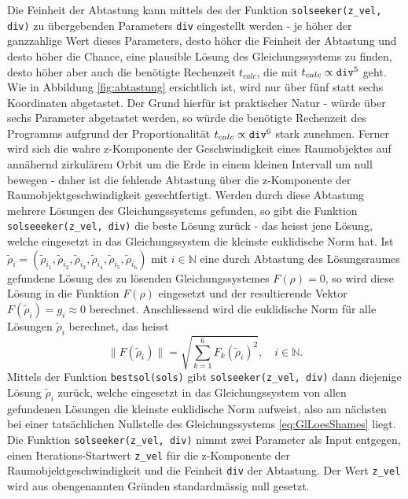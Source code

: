 \documentclass[a4paper,12pt]{article}
\numberwithin{equation}{section}
\begin{document}
Die Feinheit der Abtastung kann mittels des der Funktion \verb|solseeker(z_vel, div)| zu übergebenden Parameters \verb|div| eingestellt werden - je höher der ganzzahlige Wert dieses Parameters, desto höher die Feinheit der Abtastung und desto höher die Chance, eine plausible Lösung des Gleichungssystems zu finden, desto höher aber auch die benötigte Rechenzeit $t_{calc}$, die mit $t_{calc}\propto \verb|div|^5$ geht. Wie in Abbildung \ref{fig:abtastung} ersichtlich ist, wird nur über fünf statt sechs Koordinaten abgetastet. Der Grund hierfür ist praktischer Natur - würde über sechs Parameter abgetastet werden, so würde die benötigte Rechenzeit des Programms aufgrund der Proportionalität $t_{calc} \propto \verb|div|^6$ stark zunehmen. Ferner wird sich die wahre z-Komponente der Geschwindigkeit eines Raumobjektes auf annähernd zirkulärem Orbit um die Erde in einem kleinen Intervall um null bewegen - daher ist die fehlende Abtastung über die z-Komponente der Raumobjektgeschwindigkeit gerechtfertigt. Werden durch diese Abtastung mehrere Lösungen des Gleichungssystems gefunden, so gibt die Funktion \verb|solseeeker(z_vel, div)| die beste Lösung zurück - das heisst jene Lösung, welche eingesetzt in das Gleichungssystem die kleinste euklidische Norm hat. Ist $\tilde{\rho}_i = (\tilde{\rho}_{i_1},\tilde{\rho}_{i_2},\tilde{\rho}_{i_3},\tilde{\rho}_{i_4},\tilde{\rho}_{i_5},\tilde{\rho}_{i_6})$ mit $i \in \mathbb{N}$ eine durch Abtastung des Lösungsraumes gefundene Lösung des zu lösenden Gleichungssystemes $F(\rho) = 0$, so wird diese Lösung in die Funktion $F(\rho)$ eingesetzt und der resultierende Vektor $F(\tilde{\rho}_i) = g_i \approx 0$ berechnet. Anschliessend wird die euklidische Norm für alle Lösungen $\tilde{\rho}_i$ berechnet, das heisst \begin{equation}\label{eq:normseeker}
\|F(\tilde{\rho}_i)\| = \sqrt{\sum_{k=1}^{6}F_k(\tilde{\rho}_i)^2}, \quad i \in \mathbb{N}.
\end{equation} Mittels der Funktion \verb|bestsol(sols)| gibt \verb|solseeker(z_vel, div)| dann diejenige Lösung $\tilde{\rho}_i$ zurück, welche eingesetzt in das Gleichungssystem von allen gefundenen Lösungen die kleinste euklidische Norm aufweist, also am nächsten bei einer tatsächlichen Nullstelle des Gleichungssystems \eqref{eq:GlLoesShames} liegt. Die Funktion \verb|solseeker(z_vel, div)| nimmt zwei Parameter als Input entgegen, einen Iterations-Startwert \verb|z_vel| für die z-Komponente der Raumobjektgeschwindigkeit und die Feinheit \verb|div| der Abtastung. Der Wert \verb|z_vel| wird aus obengenannten Gründen standardmässig null gesetzt.
\end{document}
